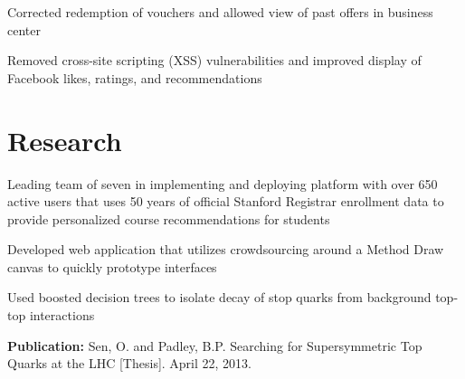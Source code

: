 \documentclass{onkursen-resume}
\begin{document}
\begin{itemize*}
\item Corrected redemption of vouchers and allowed view of past offers in business center
\end{itemize*}
\vspace{-1mm}

\begin{itemize*}
\item Removed cross-site scripting (XSS) vulnerabilities and improved display of Facebook likes, ratings, and recommendations
\end{itemize*}
\vspace{-1mm}

\hr

\section*{Research}

\begin{itemize*}
\item Leading team of seven in implementing and deploying platform with over 650 active users that uses 50 years of official Stanford Registrar enrollment data to provide personalized course recommendations for students
\end{itemize*}
\vspace{-1mm}

\begin{itemize*}
\item Developed web application that utilizes crowdsourcing around a Method Draw canvas to quickly prototype interfaces
\end{itemize*}
\vspace{-1mm}

\begin{itemize*}
\item Used boosted decision trees to isolate decay of stop quarks from background top-top interactions
\item {\bf Publication:} Sen, O. and Padley, B.P. Searching for Supersymmetric Top Quarks at the LHC [Thesis]. April 22, 2013.
\end{itemize*}
\vspace{-1mm}
\end{document}
